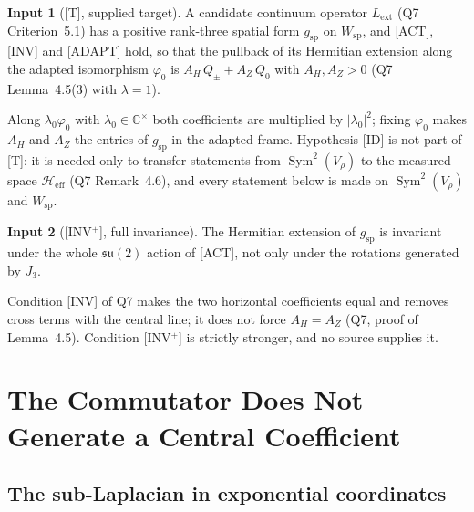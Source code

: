 \documentclass[11pt,a4paper]{article}
\theoremstyle{definition}
\newtheorem*{hypo}{Input}
\theoremstyle{remark}
\DeclareMathOperator{\Sym}{Sym}
\newcommand{\heff}{\mathcal{H}_{\mathrm{eff}}}
\newcommand{\Lext}{L_{\mathrm{ext}}}
\newcommand{\Vr}{V_{\rho}}
\newcommand{\Wsp}{W_{\mathrm{sp}}}
\newcommand{\suTwo}{\mathfrak{su}(2)}
\newcommand{\Az}{A_{Z}}
\newcommand{\AH}{A_{H}}
\begin{document}
      \begin{hypo}[{[T]}, supplied target]
        A candidate continuum operator $\Lext$ (Q7 Criterion~5.1) has a positive rank-three spatial form
        $g_{\mathrm{sp}}$ on $\Wsp$, and [ACT], [INV] and [ADAPT] hold, so that the pullback of its Hermitian
        extension along the adapted isomorphism $\varphi_0$ is $\AH\,Q_\pm + \Az\,Q_0$ with $\AH, \Az > 0$
        (Q7 Lemma~4.5(3) with $\lambda = 1$).
      \end{hypo}

      Along $\lambda_0\varphi_0$ with $\lambda_0 \in \mathbb{C}^\times$ both coefficients are multiplied by
      $|\lambda_0|^2$; fixing $\varphi_0$ makes $\AH$ and $\Az$ the entries of $g_{\mathrm{sp}}$ in the adapted frame.
      Hypothesis [ID] is not part of [T]: it is needed only to transfer statements from $\Sym^2(\Vr)$ to the measured
      space $\heff$ (Q7 Remark~4.6), and every statement below is made on $\Sym^2(\Vr)$ and $\Wsp$.

      \begin{hypo}[{[INV$^+$]}, full invariance]
        The Hermitian extension of $g_{\mathrm{sp}}$ is invariant under the whole $\suTwo$ action of [ACT], not only
        under the rotations generated by $J_3$.
      \end{hypo}

      Condition [INV] of Q7 makes the two horizontal coefficients equal and removes cross terms with the central line;
      it does not force $\AH = \Az$ (Q7, proof of Lemma~4.5).
      Condition [INV$^+$] is strictly stronger, and no source supplies it.

  \section{The Commutator Does Not Generate a Central Coefficient}\label{sec:source}

    \subsection{The sub-Laplacian in exponential coordinates}
\end{document}
